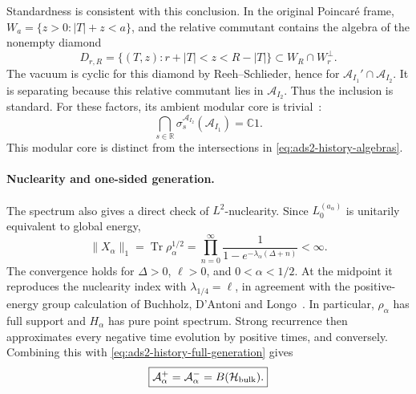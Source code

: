 \documentclass[a4paper,11pt]{article}
\theoremstyle{definition}
\begin{document}
Standardness is consistent with this conclusion. In the original
Poincar\'e frame, $W_a=\{z>0:|T|+z<a\}$, and the relative commutant
contains the algebra of the nonempty diamond
\begin{equation}
 D_{r,R}=\{(T,z):r+|T|<z<R-|T|\}
 \subset W_R\cap W_r^\perp .
\end{equation}
The vacuum is cyclic for this diamond by Reeh--Schlieder, hence for
$\mathcal A_{I_1}'\cap\mathcal A_{I_2}$. It is separating because this
relative commutant lies in $\mathcal A_{I_2}$. Thus the inclusion is
standard. For these factors, its ambient modular core is
trivial~\cite{companion}:
\begin{equation}
 \bigcap_{s\in\mathbb R}
 \sigma_s^{\mathcal A_{I_2}}(\mathcal A_{I_1})=\mathbb C1.
 \label{eq:ads2-history-modular-core}
\end{equation}
This modular core is distinct from the intersections in
\eqref{eq:ads2-history-algebras}.

\paragraph{Nuclearity and one-sided generation.}
The spectrum also gives a direct check of $L^2$-nuclearity. Since
$L_0^{(a_\alpha)}$ is unitarily equivalent to global energy,
\begin{equation}
 \|X_\alpha\|_1
 =\operatorname{Tr}\rho_\alpha^{1/2}
 =\prod_{n=0}^\infty
   \frac{1}{1-e^{-\lambda_\alpha(\Delta+n)}}<\infty.
 \label{eq:ads2-history-nuclearity}
\end{equation}
The convergence holds for $\Delta>0$, $\ell>0$, and
$0<\alpha<1/2$. At the midpoint it reproduces the nuclearity index
with $\lambda_{1/4}=\ell$, in agreement with the positive-energy
group calculation of Buchholz, D'Antoni and Longo~\cite{BDL2007}.
In particular, $\rho_\alpha$ has full support and $H_\alpha$ has pure
point spectrum. Strong recurrence then approximates every negative
time evolution by positive times, and conversely. Combining this
with \eqref{eq:ads2-history-full-generation} gives
\begin{equation}
 \boxed{
 \mathcal A_\alpha^+
 =\mathcal A_\alpha^-
 =B(\mathcal H_{\rm bulk}).
 }
 \label{eq:ads2-history-one-sided-generation}
\end{equation}
\end{document}
